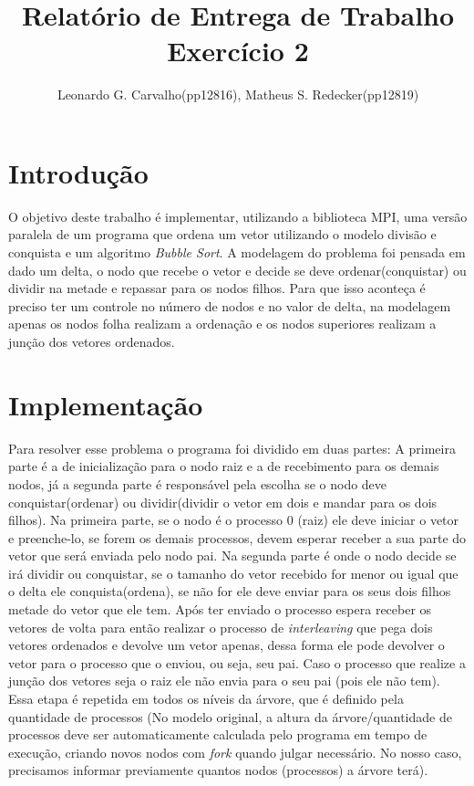 \documentclass[12pt]{article}
\title{Relatório de Entrega de Trabalho \\
       Exercício 2}
\author{Leonardo G. Carvalho(pp12816), Matheus S. Redecker(pp12819)}
\begin{document}
 

\maketitle

{\small
\begin{multicols}{2}
\section{Introdução}
O objetivo deste trabalho é implementar, utilizando a biblioteca MPI, uma versão paralela de um programa que ordena um vetor utilizando o modelo divisão e conquista e um algoritmo \textit{Bubble Sort}. A modelagem do problema foi pensada em dado um delta, o nodo que recebe o vetor e decide se deve ordenar(conquistar) ou dividir na metade e repassar para os nodos filhos. Para que isso aconteça é preciso ter um controle no número de nodos e no valor de delta, na modelagem apenas os nodos folha realizam a ordenação e os nodos superiores realizam a junção dos vetores ordenados.

\section{Implementação}
Para resolver esse problema o programa foi dividido em duas partes: A primeira parte é a de inicialização para o nodo raiz e a de recebimento para os demais nodos, já a segunda parte é responsável pela escolha se o nodo deve conquistar(ordenar) ou dividir(dividir o vetor em dois e mandar para os dois filhos). Na primeira parte, se o nodo é o processo 0 (raiz) ele deve iniciar o vetor e preenche-lo, se forem os demais processos, devem esperar receber a sua parte do vetor que será enviada pelo nodo pai. Na segunda parte é onde o nodo decide se irá dividir ou conquistar, se o tamanho do vetor recebido for menor ou igual que o delta ele conquista(ordena), se não for ele deve enviar para os seus dois filhos metade do vetor que ele tem. Após ter enviado o processo espera receber os vetores de volta para então realizar o processo de \textit{interleaving} que pega dois vetores ordenados e devolve um vetor apenas, dessa forma ele pode devolver o vetor para o processo que o enviou, ou seja, seu pai. Caso o processo que realize a junção dos vetores seja o raiz ele não envia para o seu pai (pois ele não tem). Essa etapa é repetida em todos os níveis da árvore, que é definido pela quantidade de processos (No modelo original, a altura da árvore/quantidade de processos deve ser automaticamente calculada pelo programa em tempo de execução, criando novos nodos com \textit{fork} quando julgar necessário. No nosso caso, precisamos informar previamente quantos nodos (processos) a árvore terá).


\end{multicols}}
\end{document}
